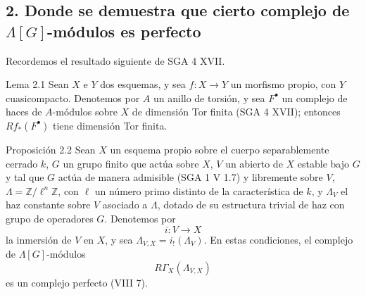 \subsection*{2. Donde se demuestra que cierto complejo de $\Lambda[G]$-módulos es perfecto}

Recordemos el resultado siguiente de SGA 4 XVII.

\begin{statement}{Lema 2.1}
Sean $X$ e $Y$ dos esquemas, y sea $f:X\to Y$ un morfismo propio, con $Y$ cuasicompacto. Denotemos por $A$ un anillo de torsión, y sea $F^\bullet$ un complejo de haces de $A$-módulos sobre $X$ de dimensión Tor finita (SGA 4 XVII); entonces $Rf_*(F^\bullet)$ tiene dimensión Tor finita.
\end{statement}

\begin{statement}{Proposición 2.2}
Sean $X$ un esquema propio sobre el cuerpo separablemente cerrado $k$, $G$ un grupo finito que actúa sobre $X$, $V$ un abierto de $X$ estable bajo $G$ y tal que $G$ actúa de manera admisible (SGA 1 V 1.7) y libremente sobre $V$, $\Lambda=\mathbb Z/\ell^n\mathbb Z$, con $\ell$ un número primo distinto de la característica de $k$, y $\Lambda_V$ el haz constante sobre $V$ asociado a $\Lambda$, dotado de su estructura trivial de haz con grupo de operadores $G$. Denotemos por
\[
i:V\longrightarrow X
\]
la inmersión de $V$ en $X$, y sea $\Lambda_{V,X}=i_!(\Lambda_V)$. En estas condiciones, el complejo de $\Lambda[G]$-módulos
\[
R\Gamma_X(\Lambda_{V,X})
\]
es un complejo perfecto (VIII 7).
\end{statement}
